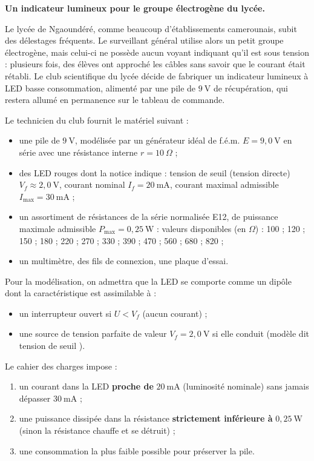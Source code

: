 \documentclass[11pt]{article}
\newcommand{\cle}[1]{{\popxbold\color{popdark}#1}}
\newcounter{popsec}
\newcounter{popsub}
\newcommand{\courssub}[1]{%
  \stepcounter{popsub}%
  \par\vspace{9pt}\noindent{\popxbold\fontsize{11.5}{13}\selectfont\color{popink}{\color{poporange}\thepopsec.\thepopsub}\hspace{6pt}#1}\par\nopagebreak\vspace{4pt}
}
\begin{document}
\courssub{Situation}

\textbf{Un indicateur lumineux pour le groupe électrogène du lycée.}

Le lycée de Ngaoundéré, comme beaucoup d'établissements camerounais, subit des délestages fréquents. Le surveillant général utilise alors un petit groupe électrogène, mais celui-ci ne possède aucun voyant indiquant qu'il est sous tension : plusieurs fois, des élèves ont approché les câbles sans savoir que le courant était rétabli. Le club scientifique du lycée décide de fabriquer un \cle{indicateur lumineux à LED} basse consommation, alimenté par une pile de $9\ \text{V}$ de récupération, qui restera allumé en permanence sur le tableau de commande.

Le technicien du club fournit le matériel suivant :
\begin{itemize}
\item une pile de $9\ \text{V}$, modélisée par un générateur idéal de f.é.m. $E = 9{,}0\ \text{V}$ en série avec une résistance interne $r = 10\ \Omega$ ;
\item des LED rouges dont la notice indique : tension de seuil (tension directe) $V_f \approx 2{,}0\ \text{V}$, courant nominal $I_f = 20\ \text{mA}$, courant maximal admissible $I_{\max} = 30\ \text{mA}$ ;
\item un assortiment de résistances de la série normalisée E12, de puissance maximale admissible $P_{\max} = 0{,}25\ \text{W}$ : valeurs disponibles (en $\Omega$) : 100 ; 120 ; 150 ; 180 ; 220 ; 270 ; 330 ; 390 ; 470 ; 560 ; 680 ; 820 ;
\item un multimètre, des fils de connexion, une plaque d'essai.
\end{itemize}

Pour la modélisation, on admettra que la LED se comporte comme un dipôle dont la caractéristique est assimilable à :
\begin{itemize}
\item un interrupteur ouvert si $U < V_f$ (aucun courant) ;
\item une source de tension parfaite de valeur $V_f = 2{,}0\ \text{V}$ si elle conduit (modèle dit \og tension de seuil \fg{}).
\end{itemize}

Le cahier des charges impose :
\begin{enumerate}
\item un courant dans la LED \textbf{proche de} $20\ \text{mA}$ (luminosité nominale) sans jamais dépasser $30\ \text{mA}$ ;
\item une puissance dissipée dans la résistance \textbf{strictement inférieure à} $0{,}25\ \text{W}$ (sinon la résistance chauffe et se détruit) ;
\item une consommation la plus faible possible pour préserver la pile.
\end{enumerate}
\end{document}
